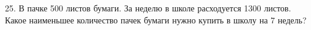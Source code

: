 25. В пачке 500 листов бумаги. За неделю в школе расходуется 1300 листов. Какое наименьшее количество пачек бумаги нужно купить в школу на 7 недель?\\
